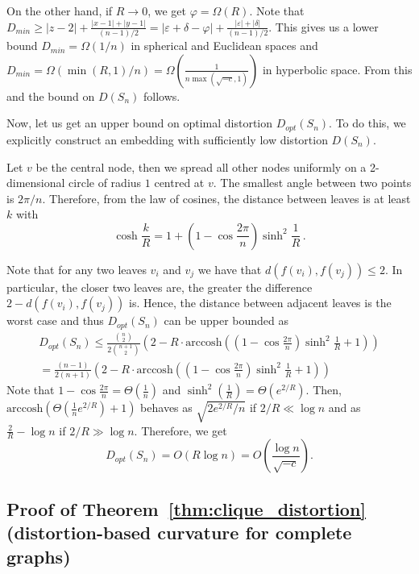 \documentclass{article} %
\begin{document}
On the other hand, if $R \to 0$, we get $\varphi = \Omega(R)$.
Note that $D_{min} \ge |z-2| + \frac{|x-1| + |y-1|}{(n-1)/2} =  |\varepsilon + \delta - \varphi| + \frac{|\varepsilon| + |\delta|}{(n-1)/2}$. This gives us a lower bound $D_{min} = \Omega(1/n)$ in spherical and Euclidean spaces and 
$D_{min} = \Omega(\min(R,1)/n) = \Omega\left(\frac{1}{n\max\left(\sqrt{-c},1\right)}\right)$ in hyperbolic space.
From this and  the bound on $D(S_n)$ follows.

Now, let us get an upper bound on optimal distortion $D_{opt}(S_n)$. To do this, we explicitly construct an embedding with sufficiently low distortion $D(S_n)$.

Let $v$ be the central node, then we spread all other nodes uniformly on a 2-dimensional circle of radius $1$ centred at $v$. The smallest angle between two points is $2 \pi / n$. Therefore, from the law of cosines, the distance between leaves is at least $k$ with
\[
\cosh \frac{k}{R} = 1  + \left(1 -  \cos \frac{2 \pi}{n}\right)  \sinh^2 \frac{1}{R} \,.
\]

Note that for any two leaves $v_i$ and $v_j$ we have that $d(f(v_i), f(v_j)) \le 2$. In particular, the closer two leaves are, the greater the difference $2 - d(f(v_i), f(v_j))$ is. Hence, the distance between adjacent leaves is the worst case and thus $D_{opt}(S_n)$ can be upper bounded as
\begin{multline*}
D_{opt}(S_n) \le \frac{{n \choose 2}}{2{n+1\choose 2}} \left(2 - R\cdot \mathrm{arccosh}\left( \left(1 - \cos \frac{2 \pi}{n}\right)\sinh^2\frac{1}{R}  + 1 \right)\right) \\
= \frac{(n-1)}{2(n+1)} \left(2 - R\cdot \mathrm{arccosh}\left( \left(1 - \cos \frac{2 \pi}{n}\right)\sinh^2\frac{1}{R}  + 1 \right)\right)
\end{multline*}
Note that $1 - \cos\frac{2\pi}{n} = \Theta\left(\frac{1}{n}\right)$ and $\sinh^2\left(\frac{1}{R}\right) = \Theta\left(e^{2/R}\right)$.
Then, $\textrm{arccosh}\left(\Theta\left(\frac{1}{n} e^{2/R}\right) + 1 \right)$ behaves as $\sqrt{2e^{2/R}/n}$ if $2/R \ll \log n$ and as $\frac{2}{R} - \log n$ if $2/R \gg \log n$.
Therefore, we get
\[
D_{opt}(S_n) = O\left( R \log n \right) = O\left( \frac{\log n}{\sqrt{-c}} \right).
\]

\subsection{Proof of Theorem~\ref{thm:clique_distortion} (distortion-based curvature for complete graphs)}\label{app:clique_distortion}
\end{document}
